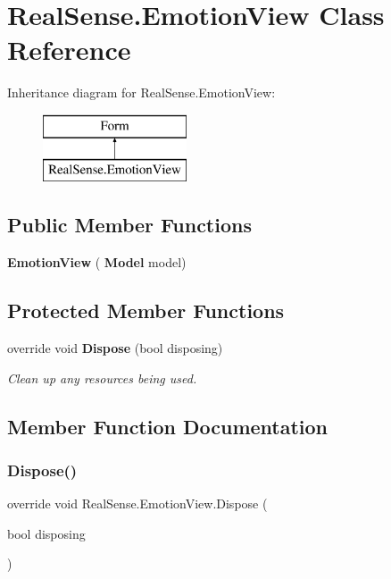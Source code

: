 \section{Real\+Sense.\+Emotion\+View Class Reference}
\label{class_real_sense_1_1_emotion_view}
Inheritance diagram for Real\+Sense.\+Emotion\+View\+:\begin{figure}[H]
\begin{center}
\leavevmode
\includegraphics[height=2.000000cm]{class_real_sense_1_1_emotion_view}
\end{center}
\end{figure}
\subsection*{Public Member Functions}
\begin{DoxyCompactItemize}
\item 
\mbox{\label{class_real_sense_1_1_emotion_view_a6f0e3d2564b7ecfea7c153faf76b53a6}} 
{\bfseries Emotion\+View} (\textbf{ Model} model)
\end{DoxyCompactItemize}
\subsection*{Protected Member Functions}
\begin{DoxyCompactItemize}
\item 
override void \textbf{ Dispose} (bool disposing)
\begin{DoxyCompactList}\small\item\em Clean up any resources being used. \end{DoxyCompactList}\end{DoxyCompactItemize}


\subsection{Member Function Documentation}
\mbox{\label{class_real_sense_1_1_emotion_view_a544db73a74ee3f66ec3c810121e45bc4}} 
\subsubsection{Dispose()}
{\footnotesize\ttfamily override void Real\+Sense.\+Emotion\+View.\+Dispose (\begin{DoxyParamCaption}\item[{bool}]{disposing }\end{DoxyParamCaption})\hspace{0.3cm}{\ttfamily [protected]}}



